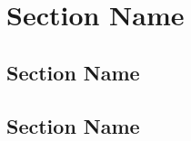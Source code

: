 \documentclass[../../note.tex]{subfiles}
\begin{document}
\chapter{Section Name}

\section{Section Name}

\section{Section Name}
\end{document}

